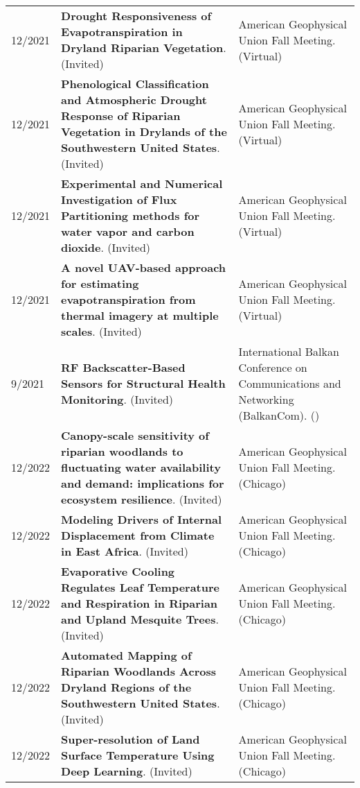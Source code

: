 \begin{longtable}{lp{9.0cm}p{4.5cm}}
12/2021 & {\bf Drought Responsiveness of Evapotranspiration in Dryland Riparian Vegetation}.   (Invited)  & American Geophysical Union Fall Meeting. (Virtual) \\
  
12/2021 & {\bf Phenological Classification and Atmospheric Drought Response of Riparian Vegetation in Drylands of the Southwestern United States}.   (Invited)  & American Geophysical Union Fall Meeting. (Virtual) \\
  
12/2021 & {\bf Experimental and Numerical Investigation of Flux Partitioning methods for water vapor and carbon dioxide}.   (Invited)  & American Geophysical Union Fall Meeting. (Virtual) \\
  
12/2021 & {\bf A novel UAV-based approach for estimating evapotranspiration from thermal imagery at multiple scales}.   (Invited)  & American Geophysical Union Fall Meeting. (Virtual) \\
  
9/2021 & {\bf RF Backscatter-Based Sensors for Structural Health Monitoring}.   (Invited)  & International Balkan Conference on Communications and Networking (BalkanCom). () \\
  
12/2022 & {\bf Canopy-scale sensitivity of riparian woodlands to fluctuating water availability and demand: implications for ecosystem resilience}.   (Invited)  & American Geophysical Union Fall Meeting. (Chicago) \\
  
12/2022 & {\bf Modeling Drivers of Internal Displacement from Climate in East Africa}.   (Invited)  & American Geophysical Union Fall Meeting. (Chicago) \\
  
12/2022 & {\bf Evaporative Cooling Regulates Leaf Temperature and Respiration in Riparian and Upland Mesquite Trees}.   (Invited)  & American Geophysical Union Fall Meeting. (Chicago) \\
  
12/2022 & {\bf Automated Mapping of Riparian Woodlands Across Dryland Regions of the Southwestern United States}.   (Invited)  & American Geophysical Union Fall Meeting. (Chicago) \\
  
12/2022 & {\bf Super-resolution of Land Surface Temperature Using Deep Learning}.   (Invited)  & American Geophysical Union Fall Meeting. (Chicago) \\
  

\end{longtable}
